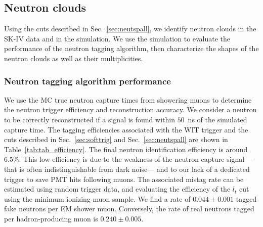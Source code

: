 \subsection{Neutron clouds}
Using the cuts described in Sec.~\ref{sec:neutspall}, we identify neutron clouds in the SK-IV data and in the simulation. We use the simulation to evaluate the performance of the neutron tagging algorithm, then characterize the shapes of the neutron clouds as well as their multiplicities.

\subsubsection{Neutron tagging algorithm performance}
We use the MC true neutron capture times from showering muons to determine the neutron trigger efficiency and reconstruction accuracy. We consider a neutron to be correctly reconstructed if a signal is found within $50$~ns of the simulated capture time. The tagging efficiencies associated with the WIT trigger and the cuts described in Sec.~\ref{sec:softtrig} and Sec.~\ref{sec:neutspall} are shown in Table~\ref{tab:tab_efficiency}. The final neutron identification efficiency is around $6.5\%$. This low efficiency is due to the weakness of the neutron capture signal ---that is often indistinguishable from dark noise--- and to our lack of a dedicated trigger to save PMT hits following muons. The associated mistag rate can be estimated using random trigger data, and evaluating the efficiency of the $l_t$ cut using the minimum ionizing muon sample. We find a rate of $0.044 \pm 0.001$ tagged fake neutrons per EM shower muon. Conversely, the rate of real neutrons tagged per hadron-producing muon is $0.240 \pm 0.005$.

